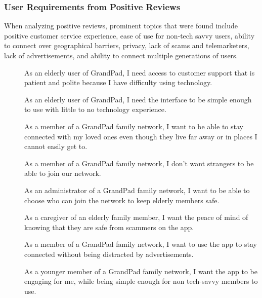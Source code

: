 \subsubsection*{User Requirements from Positive Reviews}

When analyzing positive reviews, prominent topics that were found include
    positive customer service experience,
    ease of use for non-tech savvy users,
    ability to connect over geographical barriers,
    privacy,
    lack of scams and telemarketers,
    lack of advertisements,
    and ability to connect multiple generations of users.

\begin{description}
    \item[\textbf{\showuserhelpcounter}]
        As an elderly user of GrandPad, I need access to customer support that
            is patient and polite because I have difficulty using technology.
    \item[\textbf{\showuseruicounter}]
        As an elderly user of GrandPad, I need the interface to be simple enough
            to use with little to no technology experience.
    \item[\textbf{\showusernetcounter}]
        As a member of a GrandPad family network, I want to be able to stay
            connected with my loved ones even though they live far away or in
            places I cannot easily get to.
    \item[\textbf{\showusernetcounter}]
        As a member of a GrandPad family network, I don't want strangers to be
            able to join our network.
    \item[\textbf{\showusernetcounter}]
        As an administrator of a GrandPad family network, I want to be able to
            choose who can join the network to keep elderly members safe.
    \item[\textbf{\showusernetcounter}]
        As a caregiver of an elderly family member, I want the peace of mind of
            knowing that they are safe from scammers on the app.
    \item[\textbf{\showuseruicounter}]
        As a member of a GrandPad family network, I want to use the app to stay
            connected without being distracted by advertisements.
    \item[\textbf{\showuseruicounter}]
        As a younger member of a GrandPad family network, I want the app to be
            engaging for me, while being simple enough for non tech-savvy
            members to use.
\end{description}

